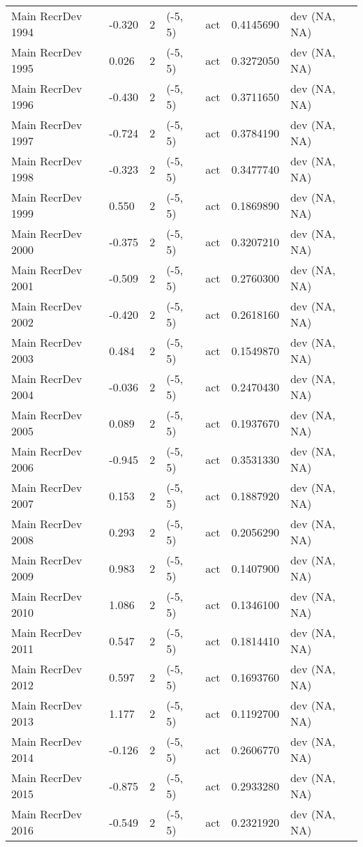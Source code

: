 \documentclass[11pt,
  english,
  letterpaper,
]{article}
\begin{document}
\begin{landscape}
\begin{longtable}[t]{>{\raggedright\arraybackslash}p{7cm}lllll>{\raggedright\arraybackslash}p{4cm}}
Main RecrDev 1994 & -0.320 & 2 & (-5, 5) & act & 0.4145690 & dev (NA, NA)\\
Main RecrDev 1995 & 0.026 & 2 & (-5, 5) & act & 0.3272050 & dev (NA, NA)\\
Main RecrDev 1996 & -0.430 & 2 & (-5, 5) & act & 0.3711650 & dev (NA, NA)\\
Main RecrDev 1997 & -0.724 & 2 & (-5, 5) & act & 0.3784190 & dev (NA, NA)\\
Main RecrDev 1998 & -0.323 & 2 & (-5, 5) & act & 0.3477740 & dev (NA, NA)\\
Main RecrDev 1999 & 0.550 & 2 & (-5, 5) & act & 0.1869890 & dev (NA, NA)\\
Main RecrDev 2000 & -0.375 & 2 & (-5, 5) & act & 0.3207210 & dev (NA, NA)\\
Main RecrDev 2001 & -0.509 & 2 & (-5, 5) & act & 0.2760300 & dev (NA, NA)\\
Main RecrDev 2002 & -0.420 & 2 & (-5, 5) & act & 0.2618160 & dev (NA, NA)\\
Main RecrDev 2003 & 0.484 & 2 & (-5, 5) & act & 0.1549870 & dev (NA, NA)\\
Main RecrDev 2004 & -0.036 & 2 & (-5, 5) & act & 0.2470430 & dev (NA, NA)\\
Main RecrDev 2005 & 0.089 & 2 & (-5, 5) & act & 0.1937670 & dev (NA, NA)\\
Main RecrDev 2006 & -0.945 & 2 & (-5, 5) & act & 0.3531330 & dev (NA, NA)\\
Main RecrDev 2007 & 0.153 & 2 & (-5, 5) & act & 0.1887920 & dev (NA, NA)\\
Main RecrDev 2008 & 0.293 & 2 & (-5, 5) & act & 0.2056290 & dev (NA, NA)\\
Main RecrDev 2009 & 0.983 & 2 & (-5, 5) & act & 0.1407900 & dev (NA, NA)\\
Main RecrDev 2010 & 1.086 & 2 & (-5, 5) & act & 0.1346100 & dev (NA, NA)\\
Main RecrDev 2011 & 0.547 & 2 & (-5, 5) & act & 0.1814410 & dev (NA, NA)\\
Main RecrDev 2012 & 0.597 & 2 & (-5, 5) & act & 0.1693760 & dev (NA, NA)\\
Main RecrDev 2013 & 1.177 & 2 & (-5, 5) & act & 0.1192700 & dev (NA, NA)\\
Main RecrDev 2014 & -0.126 & 2 & (-5, 5) & act & 0.2606770 & dev (NA, NA)\\
Main RecrDev 2015 & -0.875 & 2 & (-5, 5) & act & 0.2933280 & dev (NA, NA)\\
Main RecrDev 2016 & -0.549 & 2 & (-5, 5) & act & 0.2321920 & dev (NA, NA)\\

\end{longtable}
\end{landscape}
\end{document}
